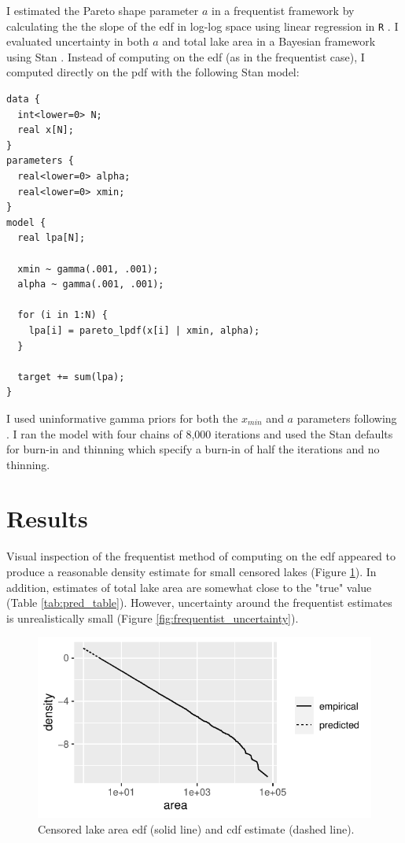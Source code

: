 \documentclass{article}
\begin{document}
I estimated the Pareto shape parameter $a$ in a frequentist framework by calculating the the slope of the edf in log-log space using linear regression in \texttt{R} \citep{team2013r}. I evaluated uncertainty in both $a$ and total lake area in a Bayesian framework using Stan \citep{standevelopmentteamStanModelingLanguage2017}. Instead of computing on the edf (as in the frequentist case), I computed directly on the pdf with the following Stan model:

\begin{minipage}[c]{0.95\textwidth}
	\begin{lstlisting}
data {
  int<lower=0> N;
  real x[N];
}
parameters {
  real<lower=0> alpha;
  real<lower=0> xmin;
}
model {
  real lpa[N];

  xmin ~ gamma(.001, .001);
  alpha ~ gamma(.001, .001);

  for (i in 1:N) {
    lpa[i] = pareto_lpdf(x[i] | xmin, alpha);
  }

  target += sum(lpa);
}
\end{lstlisting}
\end{minipage}

I used uninformative gamma priors for both the $x_{min}$ and $a$ parameters following \citet{scollnikCompositeLognormalParetoModels2007}. I ran the model with four chains of 8,000 iterations and used the Stan defaults for burn-in and thinning which specify a burn-in of half the iterations and no thinning.

\section{Results}

Visual inspection of the frequentist method of computing on the edf appeared to produce a reasonable density estimate for small censored lakes (Figure \ref{fig:predict_area}). In addition, estimates of total lake area are somewhat close to the "true" value (Table \ref{tab:pred_table}). However, uncertainty around the frequentist estimates is unrealistically small (Figure \ref{fig:frequentist_uncertainty}).

\begin{figure}
	\centering
	\includegraphics{figures/predict_area-1}
	\caption{Censored lake area edf (solid line) and cdf estimate (dashed line).}
	\label{fig:predict_area}
\end{figure}
\end{document}
